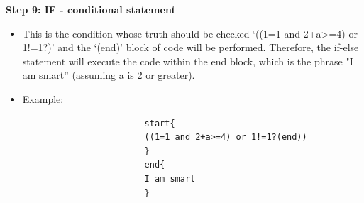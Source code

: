     \noindent \textbf{Step 9: IF - conditional statement}
 \begin{itemize}
                \item This is the condition whose truth should be checked ‘((1=1 and 2+a>=4) or 1!=1?)’ and the ‘(end)’ block of code will be performed. Therefore, the if-else statement will execute the code within the end block, which is the phrase "I am smart” (assuming a is 2 or greater).
                \item Example: \begin{verbatim}
                        start{
                        ((1=1 and 2+a>=4) or 1!=1?(end))
                        }
                        end{
                        I am smart
                        }
                        
                      \end{verbatim}
 \end{itemize}